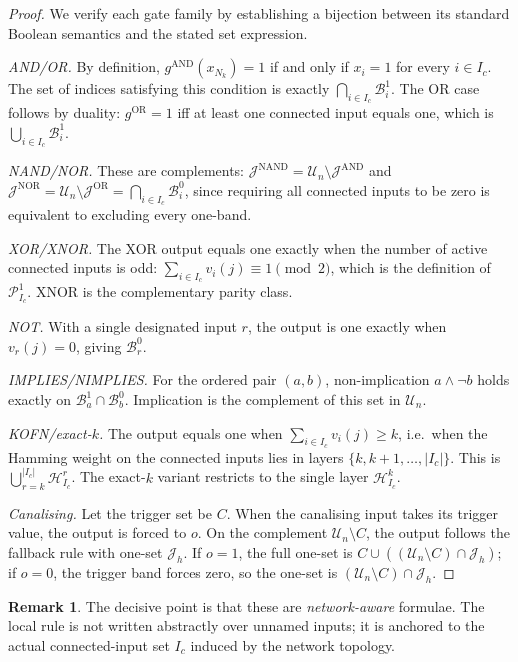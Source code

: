 \documentclass[11pt]{article}
\theoremstyle{definition}
\newtheorem{remark}{Remark}
\newcommand{\U}{\mathcal{U}_n}
\newcommand{\Ic}{I_c}
\newcommand{\J}{\mathcal{J}}
\newcommand{\Band}[2]{\mathcal{B}_{#1}^{#2}}
\newcommand{\Parity}[2]{\mathcal{P}_{#1}^{#2}}
\newcommand{\Weight}[2]{\mathcal{H}_{#1}^{#2}}
\begin{document}
\begin{proof}
We verify each gate family by establishing a bijection between its standard Boolean semantics and the stated set expression.

\emph{AND/OR.} By definition, \(g^{\mathrm{AND}}(x_{N_k})=1\) if and only if \(x_i=1\) for every \(i\in\Ic\). The set of indices satisfying this condition is exactly \(\bigcap_{i\in\Ic}\Band{i}{1}\). The OR case follows by duality: \(g^{\mathrm{OR}}=1\) iff at least one connected input equals one, which is \(\bigcup_{i\in\Ic}\Band{i}{1}\).

\emph{NAND/NOR.} These are complements: \(\J^{\mathrm{NAND}}=\U\setminus\J^{\mathrm{AND}}\) and \(\J^{\mathrm{NOR}}=\U\setminus\J^{\mathrm{OR}}=\bigcap_{i\in\Ic}\Band{i}{0}\), since requiring all connected inputs to be zero is equivalent to excluding every one-band.

\emph{XOR/XNOR.} The XOR output equals one exactly when the number of active connected inputs is odd: \(\sum_{i\in\Ic}v_i(j)\equiv 1\pmod{2}\), which is the definition of \(\Parity{\Ic}{1}\). XNOR is the complementary parity class.

\emph{NOT.} With a single designated input \(r\), the output is one exactly when \(v_r(j)=0\), giving \(\Band{r}{0}\).

\emph{IMPLIES/NIMPLIES.} For the ordered pair \((a,b)\), non-implication \(a\wedge\neg b\) holds exactly on \(\Band{a}{1}\cap\Band{b}{0}\). Implication is the complement of this set in \(\U\).

\emph{KOFN/exact-\(k\).} The output equals one when \(\sum_{i\in\Ic}v_i(j)\geq k\), i.e.\ when the Hamming weight on the connected inputs lies in layers \(\{k,k+1,\ldots,|\Ic|\}\). This is \(\bigcup_{r=k}^{|\Ic|}\Weight{\Ic}{r}\). The exact-\(k\) variant restricts to the single layer \(\Weight{\Ic}{k}\).

\emph{Canalising.} Let the trigger set be \(C\). When the canalising input takes its trigger value, the output is forced to \(o\). On the complement \(\U\setminus C\), the output follows the fallback rule with one-set \(\J_h\). If \(o=1\), the full one-set is \(C\cup((\U\setminus C)\cap\J_h)\); if \(o=0\), the trigger band forces zero, so the one-set is \((\U\setminus C)\cap\J_h\).
\end{proof}

\begin{remark}
The decisive point is that these are \emph{network-aware} formulae. The local rule is not written abstractly over unnamed inputs; it is anchored to the actual connected-input set \(\Ic\) induced by the network topology.
\end{remark}
\end{document}
